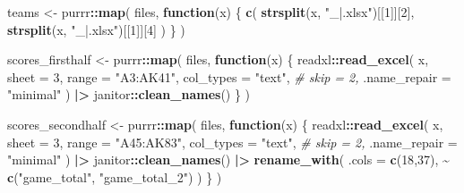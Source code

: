 \documentclass[
]{article}
\newenvironment{Shaded}{\begin{snugshade}}{\end{snugshade}}
\newcommand{\AttributeTok}[1]{\textcolor[rgb]{0.13,0.29,0.53}{#1}}
\newcommand{\CommentTok}[1]{\textcolor[rgb]{0.56,0.35,0.01}{\textit{#1}}}
\newcommand{\ControlFlowTok}[1]{\textcolor[rgb]{0.13,0.29,0.53}{\textbf{#1}}}
\newcommand{\DecValTok}[1]{\textcolor[rgb]{0.00,0.00,0.81}{#1}}
\newcommand{\FunctionTok}[1]{\textcolor[rgb]{0.13,0.29,0.53}{\textbf{#1}}}
\newcommand{\NormalTok}[1]{#1}
\newcommand{\OtherTok}[1]{\textcolor[rgb]{0.56,0.35,0.01}{#1}}
\newcommand{\SpecialCharTok}[1]{\textcolor[rgb]{0.81,0.36,0.00}{\textbf{#1}}}
\newcommand{\StringTok}[1]{\textcolor[rgb]{0.31,0.60,0.02}{#1}}
\begin{document}
\begin{Shaded}
\begin{Highlighting}[]
\NormalTok{teams }\OtherTok{\textless{}{-}}\NormalTok{ purrr}\SpecialCharTok{::}\FunctionTok{map}\NormalTok{(}
\NormalTok{  files,}
  \ControlFlowTok{function}\NormalTok{(x) \{}
    \FunctionTok{c}\NormalTok{(}
      \FunctionTok{strsplit}\NormalTok{(x, }\StringTok{"\_|.xlsx"}\NormalTok{)[[}\DecValTok{1}\NormalTok{]][}\DecValTok{2}\NormalTok{],}
      \FunctionTok{strsplit}\NormalTok{(x, }\StringTok{"\_|.xlsx"}\NormalTok{)[[}\DecValTok{1}\NormalTok{]][}\DecValTok{4}\NormalTok{]}
\NormalTok{    )}
\NormalTok{  \}}
\NormalTok{)}

\NormalTok{scores\_firsthalf }\OtherTok{\textless{}{-}}\NormalTok{ purrr}\SpecialCharTok{::}\FunctionTok{map}\NormalTok{(}
\NormalTok{  files,}
  \ControlFlowTok{function}\NormalTok{(x) \{}
\NormalTok{    readxl}\SpecialCharTok{::}\FunctionTok{read\_excel}\NormalTok{(}
\NormalTok{      x,}
      \AttributeTok{sheet =} \DecValTok{3}\NormalTok{,}
      \AttributeTok{range =} \StringTok{"A3:AK41"}\NormalTok{,}
      \AttributeTok{col\_types =} \StringTok{"text"}\NormalTok{,}
      \CommentTok{\# skip = 2,}
      \AttributeTok{.name\_repair =} \StringTok{"minimal"}
\NormalTok{    ) }\SpecialCharTok{|\textgreater{}} 
\NormalTok{      janitor}\SpecialCharTok{::}\FunctionTok{clean\_names}\NormalTok{()}
\NormalTok{  \}}
\NormalTok{)}

\NormalTok{scores\_secondhalf }\OtherTok{\textless{}{-}}\NormalTok{ purrr}\SpecialCharTok{::}\FunctionTok{map}\NormalTok{(}
\NormalTok{  files,}
  \ControlFlowTok{function}\NormalTok{(x) \{}
\NormalTok{    readxl}\SpecialCharTok{::}\FunctionTok{read\_excel}\NormalTok{(}
\NormalTok{      x,}
      \AttributeTok{sheet =} \DecValTok{3}\NormalTok{,}
      \AttributeTok{range =} \StringTok{"A45:AK83"}\NormalTok{,}
      \AttributeTok{col\_types =} \StringTok{"text"}\NormalTok{,}
      \CommentTok{\# skip = 2,}
      \AttributeTok{.name\_repair =} \StringTok{"minimal"}
\NormalTok{    ) }\SpecialCharTok{|\textgreater{}} 
\NormalTok{      janitor}\SpecialCharTok{::}\FunctionTok{clean\_names}\NormalTok{() }\SpecialCharTok{|\textgreater{}} 
      \FunctionTok{rename\_with}\NormalTok{(}
        \AttributeTok{.cols =} \FunctionTok{c}\NormalTok{(}\DecValTok{18}\NormalTok{,}\DecValTok{37}\NormalTok{),}
        \SpecialCharTok{\textasciitilde{}} \FunctionTok{c}\NormalTok{(}\StringTok{"game\_total"}\NormalTok{, }\StringTok{"game\_total\_2"}\NormalTok{)}
\NormalTok{      )}
\NormalTok{  \}}
\NormalTok{)}



\end{Highlighting}
\end{Shaded}
\end{document}
